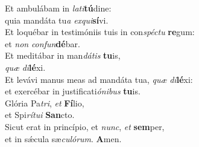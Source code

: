 \oddverse Et ambulábam in \textit{la}\textit{ti}\textbf{tú}dine:~\*\\
\oddverse quia mandáta tu\textit{a} \textit{ex}\textit{qui}\textbf{sí}vi.\\
\evenverse Et loquébar in testimóniis tuis in con\textit{spé}\textit{ctu} \textbf{re}gum:~\*\\
\evenverse et \textit{non} \textit{con}\textit{fun}\textbf{dé}bar.\\
\oddverse Et meditábar in man\textit{dá}\textit{tis} \textbf{tu}is,~\*\\
\oddverse \textit{quæ} \textit{di}\textbf{lé}xi.\\
\evenverse Et levávi manus meas ad mandáta tua, \textit{quæ} \textit{di}\textbf{lé}xi:~\*\\
\evenverse et exercébar in justificati\textit{ó}\textit{ni}\textit{bus} \textbf{tu}is.\\
\oddverse Glória Pa\textit{tri}, \textit{et} \textbf{Fí}lio,~\*\\
\oddverse et Spi\textit{rí}\textit{tu}\textit{i} \textbf{San}cto.\\
\evenverse Sicut erat in princípio, et \textit{nunc}, \textit{et} \textbf{sem}per,~\*\\
\evenverse et in sǽcula sæ\textit{cu}\textit{ló}\textit{rum}. \textbf{A}men.\\
